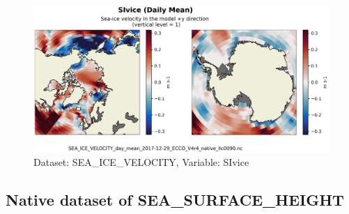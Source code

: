 \begin{figure}[H]
\centering
\includegraphics[scale=0.55]{../images/plots/v4r4/native_plots/Sea-Ice_Velocity/SIvice.png}
\caption{Dataset: SEA\_ICE\_VELOCITY, Variable: SIvice}
\label{tab:table-SEA_ICE_VELOCITY_SIvice-Plot}
\end{figure}
\newpage
\subsection{Native dataset of SEA\_SURFACE\_HEIGHT}
\newp
